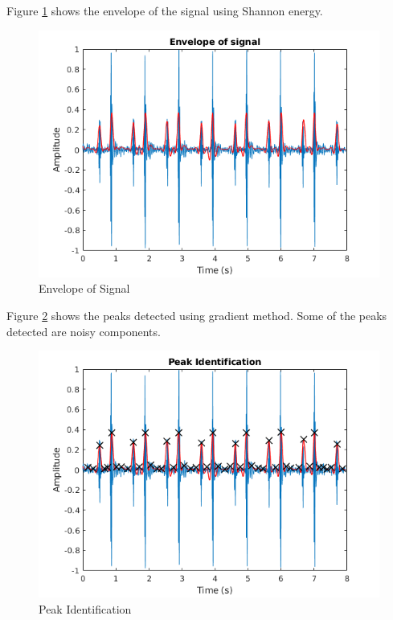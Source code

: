 \documentclass[10pt,twocolumn]{witseiepaper}
\begin{document}
Figure \ref{fig:8} shows the envelope of the signal using Shannon energy.
\begin{figure}[h!]
    \centering
    \includegraphics[scale = 0.55]{3.png}
    \caption{Envelope of Signal}
    \label{fig:8}
\end{figure}{}

Figure \ref{fig:9} shows the peaks detected using gradient method. Some of the peaks detected are noisy components.
\begin{figure}[h!]
    \centering
    \includegraphics[scale = 0.55]{4.png}
    \caption{Peak Identification}
    \label{fig:9}
\end{figure}{}
\end{document}
